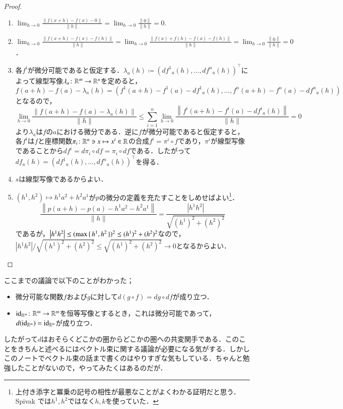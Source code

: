 \begin{proof}
\leavevmode
\begin{enumerate}
\item $\displaystyle \lim_{h \to 0} \frac{\left\| f(x+h) - f(x) - 0 \right\|}{\|h\|} = \lim_{h \to 0} \frac{\left\| 0 \right\|}{\|h\|} = 0.$
\item $\displaystyle \lim_{h \to 0} \frac{\left\| f(x+h) - f(x) - f(h) \right\|}{\|h\|} = \lim_{h \to 0} \frac{\left\| f(x) + f(h) - f(x) - f(h) \right\|}{\|h\|} = \lim_{h \to 0} \frac{\left\| 0 \right\|}{\|h\|} = 0$．
\item 各$f^i$が微分可能であると仮定する．$\lambda_a(h) \coloneqq (d{f^1}_a(h), \dots, d{f^n}_a(h))^\top$によって線型写像$\lambda_a \colon \mathbb{R}^m \to \mathbb{R}^n$を定めると，
\begin{equation}
f(a+h) - f(a) - \lambda_a(h) = (f^1(a+h) - f^1(a) - d{f^1}_a(h), \dots, f^n(a+h) - f^n(a) - d{f^n}_a(h))
\end{equation}となるので，
\begin{equation}
\lim_{h \to 0} \frac{\left\|f(a+h) - f(a) - \lambda_a(h)\right\|}{\|h\|} \leq \sum_{i=1}^n \lim_{h\to 0} \frac{\left\| f^i(a+h) - f^i(a) - d{f^i}_a(h) \right\|}{\|h\|} = 0
\end{equation}より$\lambda_a$は$f$の$a$における微分である．逆に$f$が微分可能であると仮定すると，各$f^i$は$f$と座標関数$\pi_i \colon \mathbb{R}^n \ni x \mapsto x^i \in \mathbb{R}$の合成$f^i = \pi^i \circ f$であり，$\pi^i$が線型写像であることから$df^i = d\pi_i \circ df = \pi_i \circ df$である．したがって$df_a(h) = (d{f^1}_a(h), \dots, d{f^n}_a(h))^\top$を得る．
\item $s$は線型写像であるからよい．
\item $(h^1,h^2) \mapsto h^1a^2+h^2a^1$が$p$の微分の定義を充たすことをしめせばよい\footnote{上付き添字と冪乗の記号の相性が最悪なことがよくわかる証明だと思う．Spivak では$h^1, h^2$ではなく$h,k$を使っていた．}．
\begin{equation}
\frac{\left\|p(a+h) - p(a) - h^1a^2-h^2a^1\right\|}{\|h\|} = \frac{\left|h^1h^2\right|}{\sqrt{(h^1)^2 + (h^2)^2 }}
\end{equation}であるが，$\left|h^1h^2\right| \leq (\max\set{h^1, h^2})^2 \leq (h^1)^2 + (h^2)^2$なので，$\left|h^1h^2\right| / \sqrt{(h^1)^2 + (h^2)^2 } \leq \sqrt{(h^1)^2 + (h^2)^2 } \to 0$となるからよい．
\end{enumerate}
\end{proof}

\begin{que}[**]ここまでの議論で以下のことがわかった；
\begin{itemize}
\item 微分可能な関数$f$および$g$に対して$d(g \circ f) = dg \circ df$が成り立つ．
\item $\text{id}_{\mathbb{R}^m} \colon \mathbb{R}^m \to \mathbb{R}^m$を恒等写像とするとき，これは微分可能であって，$d(\text{id}_{\mathbb{R}^m}) = \text{id}_{\mathbb{R}^m}$が成り立つ．
\end{itemize}
したがって$d$はおそらくどこかの圏からどこかの圏への共変関手である．このことをきちんと述べるにはベクトル束に関する議論が必要になる気がする．しかしこのノートでベクトル束の話まで書くのはやりすぎな気もしている．ちゃんと勉強したことがないので，やってみたくはあるのだが．
\end{que}

